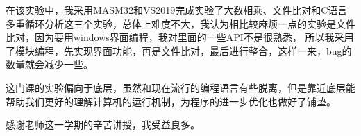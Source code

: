 %
%
%
%
%
%

\renewcommand{\thechapter}{结论}



在该实验中，我采用MASM32和VS2019完成实验了大数相乘、文件比对和C语言多重循环分析这三个实验，总体上难度不大，我认为相比较麻烦一点的实验是文件比对，因为要用windows界面编程，我对里面的一些API不是很熟悉，
所以我采用了模块编程，先实现界面功能，再是文件比对，最后进行整合，这样一来，bug的数量就会减少一些。

这门课的实验偏向于底层，虽然和现在流行的编程语言有些脱离，但是靠近底层能帮助我们更好的理解计算机的运行机制，为程序的进一步优化也做好了铺垫。

感谢老师这一学期的辛苦讲授，我受益良多。


